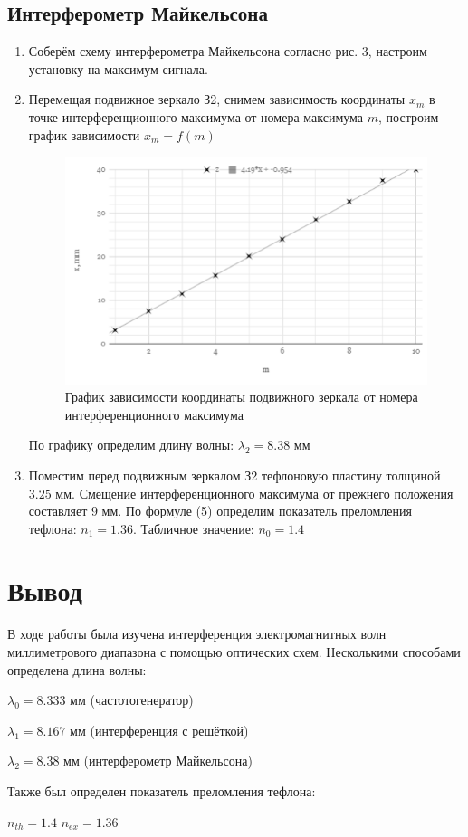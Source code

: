 \documentclass[a4paper]{article}
\begin{document}
\subsection{Интерферометр Майкельсона}
\begin{enumerate}
    \item Соберём схему интерферометра Майкельсона согласно рис. 3, настроим установку на максимум сигнала. 
    \item Перемещая подвижное зеркало З2, снимем зависимость координаты $x_m$ в точке интерференционного максимума от номера максимума $m$, построим график зависимости $x_m = f(m)$
    
\begin{figure}[h]
    \centering
    \includegraphics[width=14cm]{graph2.PNG}
    \caption{График зависимости координаты подвижного зеркала от номера интерференционного максимума}
    \label{fig:vac}
\end{figure}

По графику определим длину волны: $\lambda_2 = 8.38$ мм

\item Поместим перед подвижным зеркалом З2 тефлоновую пластину толщиной $3.25$ мм. Смещение интерференционного максимума от прежнего положения составляет $9$ мм. По формуле (5) определим показатель преломления тефлона: $n_1 = 1.36$. Табличное значение: $n_0  = 1.4$
\end{enumerate}
    
\section{Вывод}
В ходе работы была изучена интерференция электромагнитных волн миллиметрового диапазона с помощью оптических схем. Несколькими способами определена длина волны:
\begin{center}
    $\lambda_0 = 8.333$ мм (частотогенератор) \par
    $\lambda_1 = 8.167$ мм (интерференция с решёткой) \par
    $\lambda_2 = 8.38$ мм (интерферометр Майкельсона) 
\end{center}
Также был определен показатель преломления тефлона:
\begin{center}
    $n_{th} = 1.4$ \hspace{1cm} $n_{ex} = 1.36$
\end{center}
\end{document}
